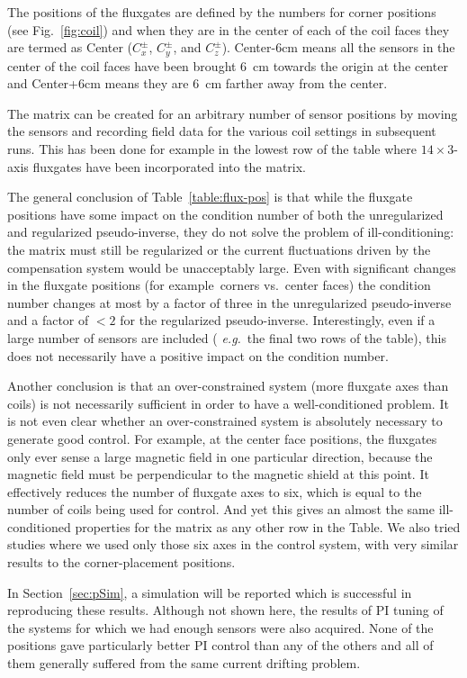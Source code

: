The positions of the fluxgates are defined by the numbers for corner
positions (see Fig.~\ref{fig:coil}) and when they are in the center of
each of the coil faces they are termed as Center ($C_x^\pm$, $C_y^\pm$, and
$C_z^\pm$). Center-6cm means all the sensors in the center of the coil
faces have been brought 6~cm towards the origin at the center and
Center+6cm means they are 6~cm farther away from the center.

The matrix can be created for an arbitrary number of sensor positions
by moving the sensors and recording field data for the various coil
settings in subsequent runs.  This has been done for example in the
lowest row of the table where $14\times 3$-axis fluxgates have been
incorporated into the matrix.

The general conclusion of Table~\ref{table:flux-pos} is that while the
fluxgate positions have some impact on the condition number of both
the unregularized and regularized pseudo-inverse, they do not solve the
problem of ill-conditioning: the matrix must still be regularized or
the current fluctuations driven by the compensation system would be
unacceptably large.  Even with significant changes in the fluxgate
positions (for example~corners vs.~center faces) the condition number
changes at most by a factor of three in the unregularized
pseudo-inverse and a factor of $<2$ for the regularized pseudo-inverse.
Interestingly, even if a large number of sensors are included ({\it
e.g.}~the final two rows of the table), this does not necessarily have
a positive impact on the condition number.

Another conclusion is that an over-constrained system (more fluxgate
axes than coils) is not necessarily sufficient in order to have a
well-conditioned problem.  It is not even clear whether an
over-constrained system is absolutely necessary to generate good
control.  For example, at the center face positions, the fluxgates
only ever sense a large magnetic field in one particular direction,
because the magnetic field must be perpendicular to the magnetic
shield at this point.  It effectively reduces the number of fluxgate
axes to six, which is equal to the number of coils being used for
control.  And yet this gives an almost the same ill-conditioned
properties for the matrix as any other row in the Table.  We also
tried studies where we used only those six axes in the control system,
with very similar results to the corner-placement positions.

In Section~\ref{sec:pSim}, a simulation will be reported which is
successful in reproducing these results.  Although not shown here, the
results of PI tuning of the systems for which we had enough sensors
were also acquired.  None of the positions gave particularly better PI
control than any of the others and all of them generally suffered from
the same current drifting problem.

